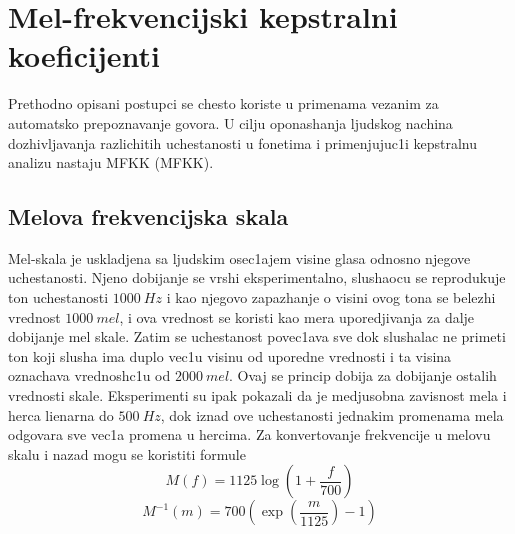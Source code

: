 \documentclass[a4paper, openany, oneside, 11pt]{book}
\begin{document}
\section{Mel-frekvencijski kepstralni koeficijenti}
Prethodno opisani postupci se chesto koriste u primenama vezanim za automat\-sko prepoznavanje govora. U cilju oponashanja ljudskog nachina dozhivljavanja razlichitih uchestanosti u fonetima i primenjujuc1i kepstralnu analizu nastaju \acrlong{MFKK} (\acrshort{MFKK}). 
\subsection{Melova frekvencijska skala}
Mel-skala je uskladjena sa ljudskim osec1ajem visine glasa odnosno njegove uchestanosti. Njeno dobijanje se vrshi eksperimentalno, slushaocu se reprodukuje ton uchestanosti $\SI{1000}{Hz}$ i kao njegovo zapazhanje o visini ovog tona se belezhi vrednost $\SI{1000}{mel}$, i ova vrednost se koristi kao mera uporedjivanja za dalje dobijanje mel skale. Zatim se uchestanost povec1ava sve dok slushalac ne primeti ton koji slusha ima duplo vec1u visinu od uporedne vrednosti i ta visina oznachava vrednosh\-c1u od $\SI{2000}{mel}$. Ovaj se princip dobija za dobijanje ostalih vrednosti skale. Eksperimenti su ipak pokazali da je medjusobna zavisnost mela i herca lienarna do $\SI{500}{Hz}$, dok iznad ove uchestanosti jednakim promenama mela odgovara sve vec1a promena u hercima. Za konvertovanje frekvencije u melovu skalu i nazad mogu se koristiti formule
\begin{equation}\label{freq2mel}
M(f) = 1125\log\left(1+\frac{f}{700}\right)
\end{equation}
\begin{equation}\label{mel2freq}
M^{-1}(m) = 700\left(\exp\left(\frac{m}{1125}\right)-1\right)
\end{equation}
\end{document}
